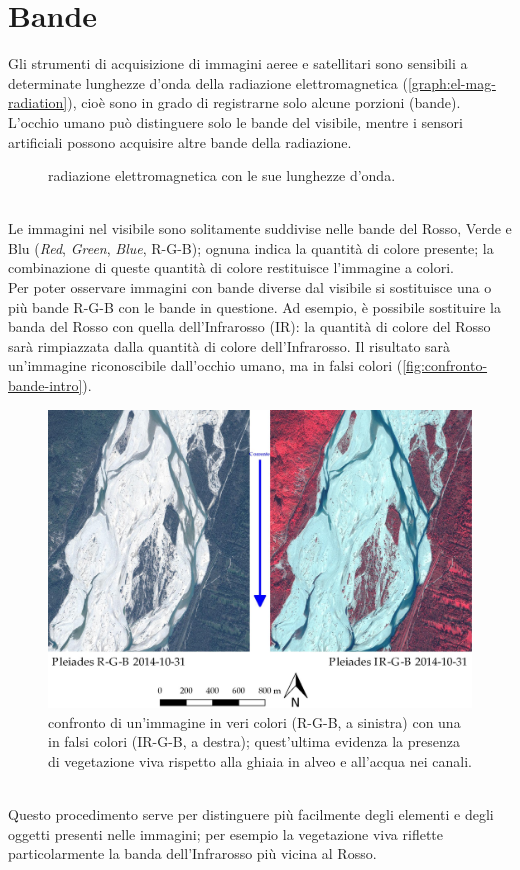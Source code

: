 \section{Bande}
Gli strumenti di acquisizione di immagini aeree e satellitari sono sensibili a determinate lunghezze d'onda della radiazione elettromagnetica (\vref{graph:el-mag-radiation}), cioè sono in grado di registrarne solo alcune porzioni (bande). 
L'occhio umano può distinguere solo le bande del visibile, mentre i sensori artificiali possono acquisire altre bande della radiazione. 
%
\begin{figure}
	\centering
	
	\caption{radiazione elettromagnetica con le sue lunghezze d'onda.}
	\label{graph:el-mag-radiation}
\end{figure}
%
\\
Le immagini nel visibile sono solitamente suddivise nelle bande del Rosso, Verde e Blu (\emph{Red}, \emph{Green}, \emph{Blue}, R-G-B); ognuna indica la quantità di colore presente; la combinazione di queste quantità di colore restituisce l'immagine a colori. 
\\
Per poter osservare immagini con bande diverse dal visibile si sostituisce una o più bande R-G-B con le bande in questione. 
Ad esempio, è possibile sostituire la banda del Rosso con quella dell'Infrarosso (IR): la quantità di colore del Rosso sarà rimpiazzata dalla quantità di colore dell'Infrarosso. 
Il risultato sarà un'immagine riconoscibile dall'occhio umano, ma in falsi colori (\vref{fig:confronto-bande-intro}).
%
\begin{figure}
	\centering
	\includegraphics[width=\textwidth]{files/confronto_bande_intro.jpeg}
	\caption[confronto immagini R-G-B e IR-R-G]{confronto di un'immagine in veri colori (R-G-B, a sinistra) con una in falsi colori (IR-G-B, a destra); quest'ultima evidenza la presenza di vegetazione viva rispetto alla ghiaia in alveo e all'acqua nei canali.}
	\label{fig:confronto-bande-intro}
\end{figure} 
%
\\
Questo procedimento serve per distinguere più facilmente degli elementi e degli oggetti presenti nelle immagini; per esempio la vegetazione viva riflette particolarmente la banda dell'Infrarosso più vicina al Rosso.




